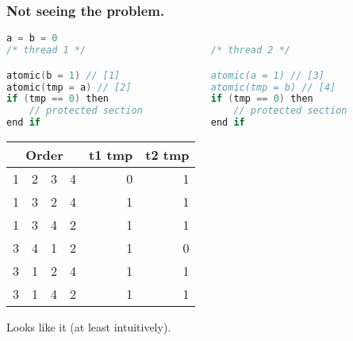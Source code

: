 \begin{frame}[fragile]
  \frametitle{Not seeing the problem.}

  \begin{lstlisting}[language=C,morekeywords={foreach,pragma,omp,parallel,single,nowait,task,untied,barrier,taskyield,mergeable,final,taskwait,critical}]
                    a = b = 0
/* thread 1 */                      /* thread 2 */

atomic(b = 1) // [1]                atomic(a = 1) // [3]
atomic(tmp = a) // [2]              atomic(tmp = b) // [4]
if (tmp == 0) then                  if (tmp == 0) then
    // protected section                // protected section
end if                              end if
  \end{lstlisting}

  \begin{center}
  \begin{tabular}{r r r r | r r}
    \multicolumn{4}{c|}{Order} & t1 tmp & t2 tmp\\
    \hline
    1 & 2 & 3 & 4 & 0 & 1\\
    1 & 3 & 2 & 4 & 1 & 1\\
    1 & 3 & 4 & 2 & 1 & 1\\
    3 & 4 & 1 & 2 & 1 & 0\\
    3 & 1 & 2 & 4 & 1 & 1\\
    3 & 1 & 4 & 2 & 1 & 1\\
  \end{tabular}
  \end{center}

  
  \begin{changemargin}{1cm}
\large
    Looks like it (at least intuitively).
  \end{changemargin}

\end{frame}

